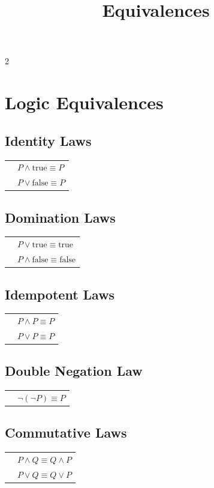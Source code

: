 \documentclass{article}
\begin{document}
\title{Equivalences}
\author{}
\date{}

\maketitle

\begin{multicols}{2}
    
\section{Logic Equivalences}
\subsection*{Identity Laws}
\begin{tabular}{l l}
& $P \land \text{true} \equiv P$ \\
& $P \lor \text{false} \equiv P$
\end{tabular}

\subsection*{Domination Laws}
\begin{tabular}{l l}
& $P \lor \text{true}  \equiv \text{true}$ \\
& $P \land \text{false}  \equiv \text{false}$
\end{tabular}

\subsection*{Idempotent Laws}
\begin{tabular}{l l}
& $P \land P  \equiv P$ \\
& $P \lor P  \equiv P$
\end{tabular}

\subsection*{Double Negation Law}
\begin{tabular}{l l}
& $\neg (\neg P)  \equiv P$
\end{tabular}

\subsection*{Commutative Laws}
\begin{tabular}{l l}
& $P \land Q  \equiv Q \land P$ \\
& $P \lor Q  \equiv Q \lor P$
\end{tabular}


\end{multicols}
\end{document}
